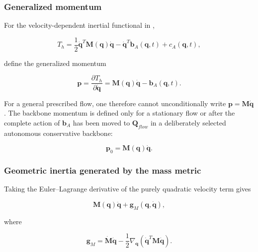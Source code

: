 \subsubsection{Generalized momentum}\label{sec:galerkin-2-6-1}

For the velocity-dependent inertial functional in ,

\begin{equation}
\label{eq:galerkin-2-82}
T_{h} = \frac{1}{2}{\dot{\mathbf{q}}}^{T}\mathbf{M}\left( \mathbf{q} \right)\dot{\mathbf{q}} - {\dot{\mathbf{q}}}^{T}\mathbf{b}_{A}\left( \mathbf{q},t \right) + c_{A}\left( \mathbf{q},t \right),
\end{equation}

define the generalized momentum

\begin{equation}
\label{eq:galerkin-2-83}
\boxed{\mathbf{p} = \frac{\partial T_{h}}{\partial\dot{\mathbf{q}}} = \mathbf{M}\left( \mathbf{q} \right)\dot{\mathbf{q}} - \mathbf{b}_{A}\left( \mathbf{q},t \right).}
\end{equation}

For a general prescribed flow, one therefore cannot unconditionally write \(\mathbf{p} = \mathbf{M}\dot{\mathbf{q}}\). The backbone momentum is defined only for a stationary flow or after the complete action of \(\mathbf{b}_{A}\) has been moved to \(\mathbf{Q}_{flow}\) in a deliberately selected autonomous conservative backbone:

\begin{equation}
\label{eq:galerkin-2-84}
\mathbf{p}_{0} = \mathbf{M}\left( \mathbf{q} \right)\dot{\mathbf{q}}.
\end{equation}

\subsubsection{Geometric inertia generated by the mass metric}\label{sec:galerkin-2-6-2}

Taking the Euler--Lagrange derivative of the purely quadratic velocity term gives

\begin{equation}
\label{eq:galerkin-2-85}
\mathbf{M}\left( \mathbf{q} \right)\ddot{\mathbf{q}} + \mathbf{g}_{M}\left( \mathbf{q},\dot{\mathbf{q}} \right),
\end{equation}

where

\begin{equation}
\label{eq:galerkin-2-86}
\boxed{\mathbf{g}_{M} = \dot{\mathbf{M}}\dot{\mathbf{q}} - \frac{1}{2}\nabla_{\mathbf{q}}\left( {\dot{\mathbf{q}}}^{T}\mathbf{M}\dot{\mathbf{q}} \right).}
\end{equation}

